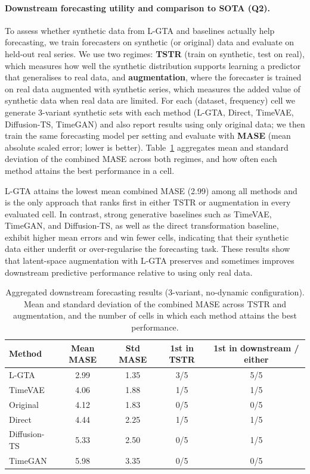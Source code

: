\paragraph{Downstream forecasting utility and comparison to SOTA (Q2).}
To assess whether synthetic data from L-GTA and baselines actually help forecasting, we train forecasters on synthetic (or original) data and evaluate on held-out real series. We use two regimes: \textbf{TSTR} (train on synthetic, test on real), which measures how well the synthetic distribution supports learning a predictor that generalises to real data, and \textbf{augmentation}, where the forecaster is trained on real data augmented with synthetic series, which measures the added value of synthetic data when real data are limited. For each (dataset, frequency) cell we generate 3-variant synthetic sets with each method (L-GTA, Direct, TimeVAE, Diffusion-TS, TimeGAN) and also report results using only original data; we then train the same forecasting model per setting and evaluate with \textbf{MASE} (mean absolute scaled error; lower is better). Table~\ref{tab:downstream-summary} aggregates mean and standard deviation of the combined MASE across both regimes, and how often each method attains the best performance in a cell.

L-GTA attains the lowest mean combined MASE (2.99) among all methods and is the only approach that ranks first in either TSTR or augmentation in every evaluated cell. In contrast, strong generative baselines such as TimeVAE, TimeGAN, and Diffusion-TS, as well as the direct transformation baseline, exhibit higher mean errors and win fewer cells, indicating that their synthetic data either underfit or over-regularise the forecasting task. These results show that latent-space augmentation with L-GTA preserves and sometimes improves downstream predictive performance relative to using only real data.

\begin{table}[h]
\centering
\caption{Aggregated downstream forecasting results (3-variant, no-dynamic configuration). Mean and standard deviation of the combined MASE across TSTR and augmentation, and the number of cells in which each method attains the best performance.}
\label{tab:downstream-summary}
\begin{tabular}{lcccc}
\toprule
\textbf{Method} & \textbf{Mean MASE} & \textbf{Std MASE} & \textbf{1st in TSTR} & \textbf{1st in downstream / either} \\
\midrule
L-GTA & 2.99 & 1.35 & 3/5 & 5/5 \\
TimeVAE & 4.06 & 1.88 & 1/5 & 1/5 \\
Original & 4.12 & 1.83 & 0/5 & 0/5 \\
Direct & 4.44 & 2.25 & 1/5 & 1/5 \\
Diffusion-TS & 5.33 & 2.50 & 0/5 & 1/5 \\
TimeGAN & 5.98 & 3.35 & 0/5 & 0/5 \\
\bottomrule
\end{tabular}
\end{table}

